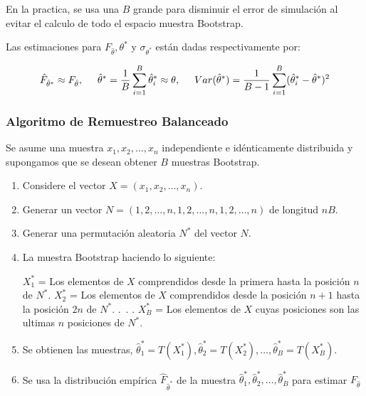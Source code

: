 En la practica, se usa una $B$ grande para disminuir el error de simulación al evitar el calculo de todo el espacio muestra Bootstrap.

Las estimaciones para  $F_{\hat{\theta}}, \theta^{*}$ y $ \sigma_{\theta^{*}} $ están dadas respectivamente por:

\[
\hat{F}_{\hat{\theta}^{*}} \approx F_{\hat{\theta}}, 
 \hspace{.5cm} \hat{\theta}^{*} = \frac{1}{B} \sum_{i=1}^{B}  \hat{\theta}^{*}_{i} \approx \theta,
 \hspace{.5cm} Var(\hat{\theta}^{*}) = \frac{1}{B-1} \sum_{i=1}^{B}(\hat{\theta}^{*}_{i}-\hat{\theta}^{*})^2
\]


\subsubsection{Algoritmo de Remuestreo Balanceado}

Se asume una muestra  $ x_{1}, x_{2},  \dots,  x_{n}$ independiente e idénticamente distribuida y supongamos que se desean obtener $B$ muestras Bootstrap.

\begin{enumerate}
	\item  Considere el vector $ X=(x_{1}, x_{2},  \dots,  x_{n}) $.
	
	\item  Generar un vector $ N= (1,2,\dots,n,1,2,\dots,n,1,2,\dots,n)$ de longitud $nB$.
	
	\item Generar una permutación aleatoria $N^{*}$ del vector $N$.
	
	\item La muestra Bootstrap haciendo lo siguiente:
	
	$X^{*}_{1}$ =  Los elementos de $X$ comprendidos desde la primera hasta la posición $n$ de $N^{*}$.\linebreak
	$X^{*}_{2}$ =  Los elementos de $X$ comprendidos desde la posición $n + 1$ hasta la posición $2n$ de $N^{*}$.\linebreak
	.\linebreak\
	.\linebreak
	.\linebreak
	$X^{*}_{B}$ =  Los elementos de $X$  cuyas posiciones son las ultimas $n$ posiciones de $N^{*}$.
	
	\item  Se obtienen las muestras, $\hat{\theta}^{*}_{1} =T (X^{*}_{1}), \hat{\theta}^{*}_{2} =T (X^{*}_{2}), \dots, \hat{\theta}^{*}_{B} =T (X^{*}_{B})$.
	
	\item  Se usa la distribución empírica $\hat{F}_{\hat{\theta}^{*}}$ de la muestra $\hat{\theta}^{*}_{1},\hat{\theta}^{*}_{2}, \dots, \hat{\theta}^{*}_{B}$ para estimar $F_{\hat{\theta}}$
	
	
\end{enumerate}







